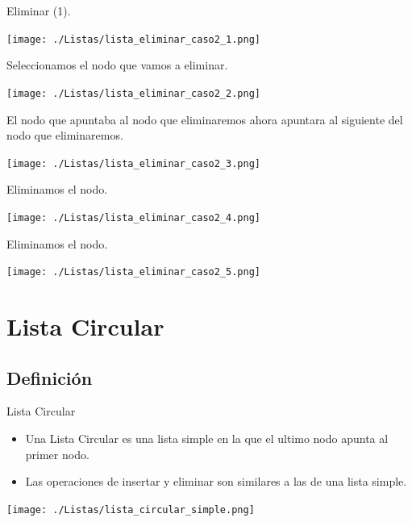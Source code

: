 \documentclass{beamer}
\begin{document}
\begin{frame}
  Eliminar (1).
  
  \texttt{[image: ./Listas/lista\_eliminar\_caso2\_1.png]}
\end{frame}


\begin{frame}
  Seleccionamos el nodo que vamos a eliminar.
  
  \texttt{[image: ./Listas/lista\_eliminar\_caso2\_2.png]}
\end{frame}

\begin{frame}
  El nodo que apuntaba al nodo que eliminaremos ahora apuntara al siguiente del nodo que eliminaremos.
  
  \texttt{[image: ./Listas/lista\_eliminar\_caso2\_3.png]}
\end{frame}

\begin{frame}
  Eliminamos el nodo.
  
  \texttt{[image: ./Listas/lista\_eliminar\_caso2\_4.png]}
\end{frame}

\begin{frame}
  Eliminamos el nodo.
  
  \texttt{[image: ./Listas/lista\_eliminar\_caso2\_5.png]}
\end{frame}

\section{Lista Circular}

\subsection{Definición}

\begin{frame}
Lista Circular \\
  \begin{itemize}
  
  \item Una Lista Circular es una lista simple en la que el ultimo nodo apunta al primer nodo.
  \item Las operaciones de insertar y eliminar son similares a las de una lista simple.	
  \end{itemize}
  \texttt{[image: ./Listas/lista\_circular\_simple.png]}
\end{frame}
\end{document}
